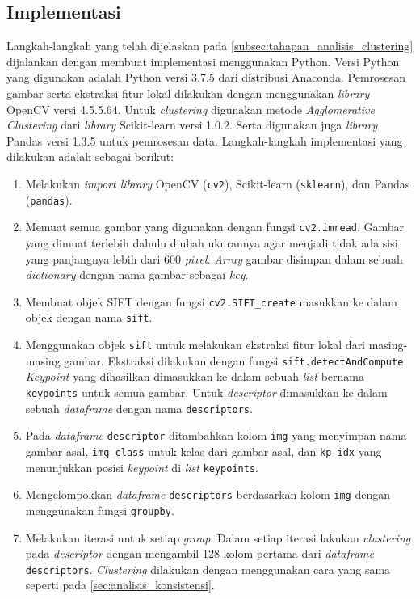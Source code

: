 \subsection{Implementasi}
\label{subsec:tahapan_implementasi_analisis_clustering}
Langkah-langkah yang telah dijelaskan pada \ref{subsec:tahapan_analisis_clustering} dijalankan dengan membuat implementasi menggunakan Python. Versi Python yang digunakan adalah Python versi 3.7.5 dari distribusi Anaconda. Pemrosesan gambar serta ekstraksi fitur lokal dilakukan dengan menggunakan \textit{library} OpenCV versi 4.5.5.64. Untuk \textit{clustering} digunakan metode \textit{Agglomerative Clustering} dari \textit{library} Scikit-learn versi 1.0.2. Serta digunakan juga \textit{library} Pandas versi 1.3.5 untuk pemrosesan data. Langkah-langkah implementasi yang dilakukan adalah sebagai berikut:
\begin{enumerate}
	\item Melakukan \textit{import library} OpenCV (\texttt{cv2}), Scikit-learn (\texttt{sklearn}), dan Pandas (\texttt{pandas}).
	\item Memuat semua gambar yang digunakan dengan fungsi \texttt{cv2.imread}. Gambar yang dimuat terlebih dahulu diubah ukurannya agar menjadi tidak ada sisi yang panjangnya lebih dari 600 \textit{pixel}. \textit{Array} gambar disimpan dalam sebuah \textit{dictionary} dengan nama gambar sebagai \textit{key}.
	\item Membuat objek SIFT dengan fungsi \texttt{cv2.SIFT\_create} masukkan ke dalam objek dengan nama \texttt{sift}.
	\item Menggunakan objek \texttt{sift} untuk melakukan ekstraksi fitur lokal dari masing-masing gambar. Ekstraksi dilakukan dengan fungsi \texttt{sift.detectAndCompute}. \textit{Keypoint} yang dihasilkan dimasukkan ke dalam sebuah \textit{list} bernama \texttt{keypoints} untuk semua gambar. Untuk \textit{descriptor} dimasukkan ke dalam sebuah \textit{dataframe} dengan nama \texttt{descriptors}.
	\item Pada \textit{dataframe} \texttt{descriptor} ditambahkan kolom \texttt{img} yang menyimpan nama gambar asal, \texttt{img\_class} untuk kelas dari gambar asal, dan \texttt{kp\_idx} yang menunjukkan posisi \textit{keypoint} di \textit{list} \texttt{keypoints}.
	\item Mengelompokkan \textit{dataframe} \texttt{descriptors} berdasarkan kolom \texttt{img} dengan menggunakan fungsi \texttt{groupby}.
	\item Melakukan iterasi untuk setiap \textit{group}. Dalam setiap iterasi lakukan \textit{clustering} pada \textit{descriptor} dengan mengambil 128 kolom pertama dari \textit{dataframe} \texttt{descriptors}. \textit{Clustering} dilakukan dengan menggunakan cara yang sama seperti pada \ref{sec:analisis_konsistensi}. 

\end{enumerate}
